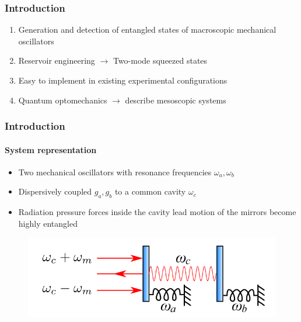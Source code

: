 \documentclass[aspectratio=43]{beamer}
\begin{document}
\begin{frame}

	\frametitle{Introduction}

	\begin{enumerate}
		\item Generation and detection of entangled states of macroscopic mechanical oscillators
		\item Reservoir engineering $\longrightarrow$ Two-mode squeezed states
		\item Easy to implement in existing experimental configurations
		\item Quantum optomechanics $\longrightarrow$ describe mesoscopic systems
	\end{enumerate}	
	
\end{frame}

\begin{frame}

	\frametitle{Introduction}
	\framesubtitle{System representation}
	
	\begin{itemize}
		\item Two mechanical oscillators with resonance frequencies $\omega_{a}, \omega_{b}$
		\item Dispersively coupled $g_{a}, g_{b}$ to a common cavity $\omega_{c}$
		\item Radiation pressure forces inside the cavity lead motion of the mirrors become highly entangled
	\end{itemize}

		\begin{figure}
			\includegraphics[width = 8 cm]{plots/plot_system.png}
		\end{figure}	

\end{frame}
\end{document}
